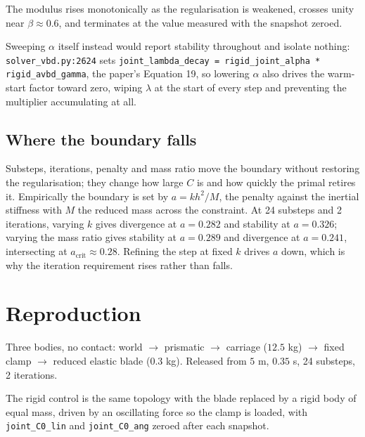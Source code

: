 \documentclass[11pt,a4paper]{article}
\begin{document}
The modulus rises monotonically as the regularisation is weakened, crosses unity near
$\beta \approx 0.6$, and terminates at the value measured with the snapshot zeroed.

Sweeping $\alpha$ itself instead would report stability throughout and isolate nothing:
\texttt{solver\_vbd.py:2624} sets
\texttt{joint\_lambda\_decay = rigid\_joint\_alpha * rigid\_avbd\_gamma}, the paper's Equation
19, so lowering $\alpha$ also drives the warm-start factor toward zero, wiping $\lambda$ at the
start of every step and preventing the multiplier accumulating at all.

\subsection{Where the boundary falls}

Substeps, iterations, penalty and mass ratio move the boundary without restoring the
regularisation; they change how large $C$ is and how quickly the primal retires it. Empirically
the boundary is set by $a = k h^2 / M$, the penalty against the inertial stiffness with $M$ the
reduced mass across the constraint. At 24 substeps and 2 iterations, varying $k$ gives
divergence at $a = 0.282$ and stability at $a = 0.326$; varying the mass ratio gives stability at
$a = 0.289$ and divergence at $a = 0.241$, intersecting at $a_{\text{crit}} \approx 0.28$.
Refining the step at fixed $k$ drives $a$ down, which is why the iteration requirement rises
rather than falls.

\section{Reproduction}

Three bodies, no contact: world $\to$ prismatic $\to$ carriage ($12.5$ kg) $\to$ fixed clamp
$\to$ reduced elastic blade ($0.3$ kg). Released from $5$ m, $0.35$ s, 24 substeps, 2
iterations.

The rigid control is the same topology with the blade replaced by a rigid body of equal mass,
driven by an oscillating force so the clamp is loaded, with \texttt{joint\_C0\_lin} and
\texttt{joint\_C0\_ang} zeroed after each snapshot.
\end{document}
